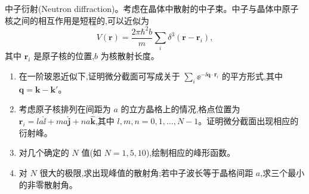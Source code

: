 \begin{question}
中子衍射(Neutron diffraction)。考虑在晶体中散射的中子束。中子与晶体中原子核之间的相互作用是短程的,可以近似为
\[
V(\mathbf r)=\frac{2\pi\hbar^2 b}{m}\sum_i\delta^3(\mathbf r-\mathbf r_i),
\]
其中 $\mathbf r_i$ 是原子核的位置,$b$ 为核散射长度。
\begin{enumerate}
\item 在一阶玻恩近似下,证明微分截面可写成关于 $\sum_i \ee^{-\ii\mathbf q\cdot\mathbf r_i}$ 的平方形式,其中 $\mathbf q=\mathbf k-\mathbf k'$。
\item 考虑原子核排列在间距为 $a$ 的立方晶格上的情况,格点位置为 $\mathbf r_i=l a\hat{\mathbf \ii}+m a\hat{\mathbf j}+n a\hat{\mathbf k}$,其中 $l,m,n=0,1,\ldots,N-1$。证明微分截面出现相应的衍射峰。
\item 对几个确定的 $N$ 值(如 $N=1,5,10$),绘制相应的峰形函数。
\item 对 $N$ 很大的极限,求出现峰值的散射角;若中子波长等于晶格间距 $a$,求三个最小的非零散射角。
\end{enumerate}
\end{question}
